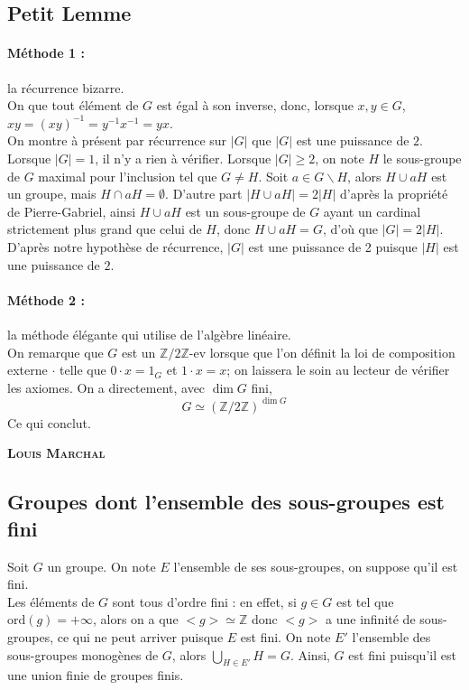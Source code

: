 \documentclass[17pt]{article}
\def\Z{\mathbb Z}
\def\ord{\text{ord}}
\begin{document}
	\subsection*{Petit Lemme}
	\paragraph{Méthode 1 :} la récurrence bizarre.\\


	On que tout élément de $G$ est égal à son inverse, donc, lorsque $x,y\in G$, $xy=(xy)^{-1}=y^{-1}x^{-1}=yx$.\\
	On montre à présent par récurrence sur $|G|$ que $|G|$ est une puissance de $2$.\\
	Lorsque $|G|=1$, il n'y a rien à vérifier.
	Lorsque $|G|\geq 2$, on note $H$ le sous-groupe de $G$ maximal pour l'inclusion tel que $G\neq H$. Soit $a\in G\backslash H$, alors $H\cup aH$ est un groupe, mais $H\cap aH=\emptyset$. D'autre part $|H\cup aH|=2|H|$ d'après la propriété de Pierre-Gabriel, ainsi $H\cup aH$ est un sous-groupe de $G$ ayant un cardinal strictement plus grand que celui de $H$, donc $H\cup aH=G$, d'où que $|G|=2|H|$. D'après notre hypothèse de récurrence, $|G|$ est une puissance de 2 puisque $|H|$ est une puissance de $2$. 
	\paragraph{Méthode 2 :} la méthode élégante qui utilise de l'algèbre linéaire.\\


	On remarque que $G$ est un $\Z/2\Z$-ev lorsque que l'on définit la loi de composition externe $\cdot$ telle que $0\cdot x=1_G$ et $1\cdot x = x$; on laissera le soin au lecteur de vérifier les axiomes. On a directement, avec $\dim G$ fini, \[G\simeq (\Z/2\Z)^{\dim G}\]
	Ce qui conclut.

	\newpage
		
	\begin{center}
		\bfseries\Large\textsc{Louis Marchal}
	\end{center}
	\subsection*{Groupes dont l'ensemble des sous-groupes est fini}
		Soit $G$ un groupe. On note $E$ l'ensemble de ses sous-groupes, on suppose qu'il est fini.\\

		Les éléments de $G$ sont tous d'ordre fini : en effet, si $g\in G$ est tel que $\ord(g)=+\infty$, alors on a que $<g>\simeq \Z$ donc $<g>$ a une infinité de sous-groupes, ce qui ne peut arriver puisque $E$ est fini. On note $E'$ l'ensemble des sous-groupes monogènes de $G$, alors $\bigcup_{H\in E'}H=G$. Ainsi, $G$ est fini puisqu'il est une union finie de groupes finis. \\
\end{document}
